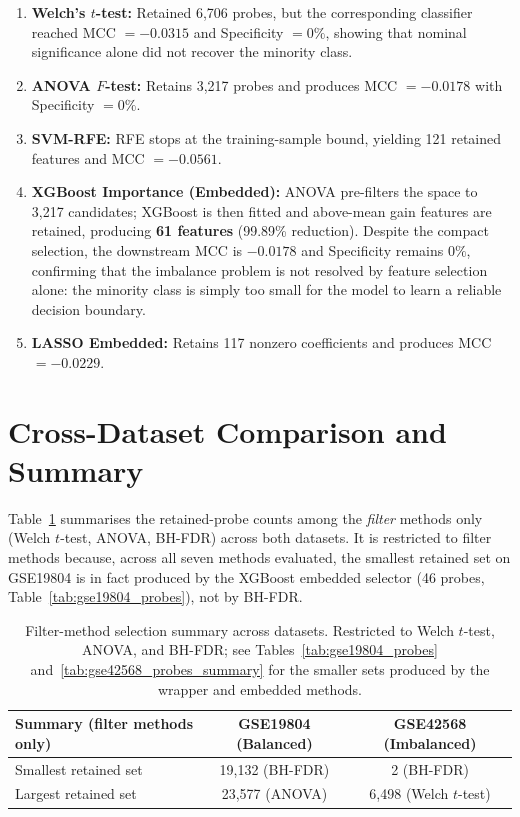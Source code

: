 \begin{enumerate}
    \item \textbf{Welch's $t$-test:} Retained 6,706 probes, but the corresponding classifier reached MCC $=-0.0315$ and Specificity $=0\%$, showing that nominal significance alone did not recover the minority class.

    \item \textbf{ANOVA $F$-test:} Retains 3,217 probes and produces MCC $=-0.0178$ with Specificity $=0\%$.

    \item \textbf{SVM-RFE:} RFE stops at the training-sample bound, yielding 121 retained features and MCC $=-0.0561$.

    \item \textbf{XGBoost Importance (Embedded):} ANOVA pre-filters the space to 3,217 candidates; XGBoost is then fitted and above-mean gain features are retained, producing \textbf{61 features} (99.89\% reduction). Despite the compact selection, the downstream MCC is $-0.0178$ and Specificity remains $0\%$, confirming that the imbalance problem is not resolved by feature selection alone: the minority class is simply too small for the model to learn a reliable decision boundary.

    \item \textbf{LASSO Embedded:} Retains 117 nonzero coefficients and produces MCC $=-0.0229$.
\end{enumerate}

\section{Cross-Dataset Comparison and Summary}

Table~\ref{tab:cross_dataset_consensus} summarises the retained-probe counts among the \emph{filter} methods only (Welch $t$-test, ANOVA, BH-FDR) across both datasets. It is restricted to filter methods because, across all seven methods evaluated, the smallest retained set on GSE19804 is in fact produced by the XGBoost embedded selector (46 probes, Table~\ref{tab:gse19804_probes}), not by BH-FDR.
\begin{table}[H]
\centering
\caption{Filter-method selection summary across datasets. Restricted to Welch $t$-test, ANOVA, and BH-FDR; see Tables~\ref{tab:gse19804_probes} and~\ref{tab:gse42568_probes_summary} for the smaller sets produced by the wrapper and embedded methods.}
\label{tab:cross_dataset_consensus}
\begin{tabular}{lcc}
\toprule
\textbf{Summary (filter methods only)} & \textbf{GSE19804 (Balanced)} & \textbf{GSE42568 (Imbalanced)} \\
\midrule
Smallest retained set & 19,132 (BH-FDR) & 2 (BH-FDR) \\
Largest retained set & 23,577 (ANOVA) & 6,498 (Welch $t$-test) \\
\bottomrule
\end{tabular}
\end{table}

